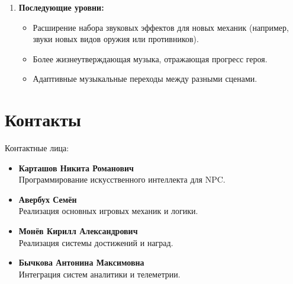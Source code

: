 \documentclass[12pt]{article}
\begin{document}
\begin{enumerate}
    \item \textbf{Последующие уровни:}
    \begin{itemize}
        \item Расширение набора звуковых эффектов для новых механик (например, звуки новых видов оружия или противников).
        \item Более жизнеутверждающая музыка, отражающая прогресс героя.
        \item Адаптивные музыкальные переходы между разными сценами.
    \end{itemize}
\end{enumerate}
    
\section{Контакты}

Контактные лица:  
\begin{itemize}
    \item \textbf{Карташов Никита Романович} \\  
    Программирование искусственного интеллекта для NPC.  
    \item \textbf{Авербух Семён } \\  
    Реализация основных игровых механик и логики.  
    \item \textbf{Монёв Кирилл Александрович} \\  
    Реализация системы достижений и наград.  
    \item \textbf{Бычкова Антонина Максимовна} \\  
    Интеграция систем аналитики и телеметрии.  
\end{itemize}


\newpage
\end{document}
